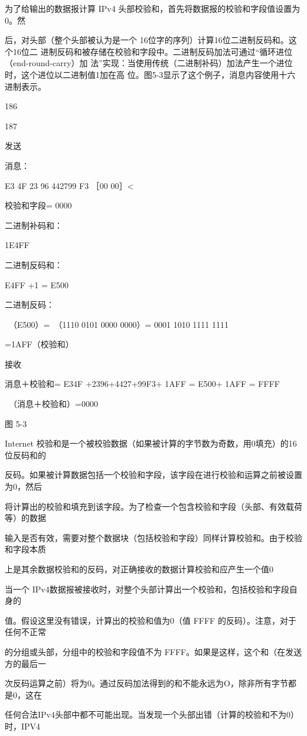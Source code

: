 为了给输出的数据报计算 IPv4 头部校验和，首先将数据报的校验和字段值设置为0。然

后，对头部（整个头部被认为是一个 16位字的序列）计算16位二进制反码和。这个16位二
进制反码和被存储在校验和字段中。二进制反码加法可通过“循环进位（end-round-carry）加
法”实现：当使用传统（二进制补码）加法产生一个进位时，这个进位以二进制值1加在高
位。图5-3显示了这个例子，消息内容使用十六进制表示。

186

187

发送

消息：

E3 4F 23 96 442799 F3 ［00 00］<

校验和字段= 0000

二进制补码和：

1E4FF

二进制反码和：

E4FF +1 = E500

二进制反码：

~（E500）=~（1110 0101 0000 0000）= 0001 1010 1111 1111

=1AFF（校验和）

接收

消息＋校验和= E34F +2396+4427+99F3+ 1AFF = E500+ 1AFF = FFFF

~（消息＋校验和）=0000

图 5-3

Internet 校验和是一个被校验数据（如果被计算的字节数为奇数，用0填充）的16位反码和的

反码。如果被计算数据包括一个校验和字段，该字段在进行校验和运算之前被设置为0，然后

将计算出的校验和填充到该字段。为了检查一个包含校验和字段（头部、有效载荷等）的数据

输入是否有效，需要对整个数据块（包括校验和字段）同样计算校验和。由于校验和字段本质

上是其余数据校验和的反码，对正确接收的数据计算校验和应产生一个值0

当一个 IPv4数据报被接收时，对整个头部计算出一个校验和，包括校验和字段自身的

值。假设这里没有错误，计算出的校验和值为0（值 FFFF 的反码）。注意，对于任何不正常

的分组或头部，分组中的校验和字段值不为 FFFF。如果是这样，这个和（在发送方的最后一

次反码运算之前）将为0。通过反码加法得到的和不能永远为O，除非所有字节都是0，这在

任何合法IPv4头部中都不可能出现。当发现一个头部出错（计算的校验和不为0）时，IPV4

